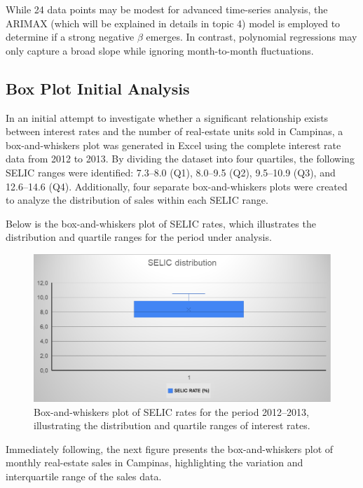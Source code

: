 \documentclass{article}
\begin{document}
While 24 data points may be modest for advanced time-series analysis, the ARIMAX (which will be explained in details in topic 4) model is employed to determine if a strong negative \(\beta\) emerges. In contrast, polynomial regressions may only capture a broad slope while ignoring month-to-month fluctuations.

\subsection{Box Plot Initial Analysis}
In an initial attempt to investigate whether a significant relationship exists between interest rates and the number of real-estate units sold in Campinas, a box-and-whiskers plot was generated in Excel using the complete interest rate data from 2012 to 2013. By dividing the dataset into four quartiles, the following SELIC ranges were identified: 7.3--8.0 (Q1), 8.0--9.5 (Q2), 9.5--10.9 (Q3), and 12.6--14.6 (Q4). Additionally, four separate box-and-whiskers plots were created to analyze the distribution of sales within each SELIC range.

Below is the box-and-whiskers plot of SELIC rates, which illustrates the distribution and quartile ranges for the period under analysis.

\begin{figure}[H]
    \centering
    \includegraphics[width=130mm]{IMG_1063.png}
    \caption{Box-and-whiskers plot of SELIC rates for the period 2012--2013, illustrating the distribution and quartile ranges of interest rates.}
    \label{fig:selic_boxplot}
\end{figure}

Immediately following, the next figure presents the box-and-whiskers plot of monthly real-estate sales in Campinas, highlighting the variation and interquartile range of the sales data.
\end{document}
